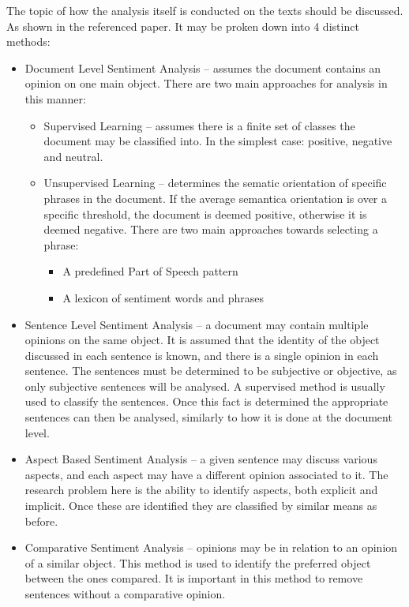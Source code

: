 The topic of how the analysis itself is conducted on the texts should be discussed. As shown in the referenced paper\cite{feldman2013techniques}. It may be proken down into 4 distinct methods:
\begin{itemize}
    \item Document Level Sentiment Analysis -- assumes the document contains an opinion on one main object. There are two main approaches for analysis in this manner:
    \begin{itemize}
        \item Supervised Learning -- assumes there is a finite set of classes the document may be classified into. In the simplest case: positive, negative and neutral.
        \item Unsupervised Learning -- determines the sematic orientation of specific phrases in the document. If the average semantica orientation is over a specific threshold, the document is deemed positive, otherwise it is deemed negative. There are two main approaches towards selecting a phrase:
        \begin{itemize}
            \item A predefined Part of Speech pattern\cite{wilson-etal-2005-recognizing}
            \item A lexicon of sentiment words and phrases\cite{10.1162/COLI_a_00049}
        \end{itemize}
    \end{itemize}
    \item Sentence Level Sentiment Analysis -- a document may contain multiple opinions on the same object. It is assumed that the identity of the object discussed in each sentence is known, and there is a single opinion in each sentence. The sentences must be determined to be subjective or objective, as only subjective sentences will be analysed. A supervised method is usually used to classify the sentences\cite{10.3115/1119355.1119372}. Once this fact is determined the appropriate sentences can then be analysed, similarly to how it is done at the document level\cite{analysePredictiveOpinionsWeb,10.3115/1119355.1119372}.
    \item Aspect Based Sentiment Analysis -- a given sentence may discuss various aspects, and each aspect may have a different opinion associated to it. The research problem here is the ability to identify aspects, both explicit and implicit. Once these are identified they are classified by similar means as before.
    \item Comparative Sentiment Analysis -- opinions may be in relation to an opinion of a similar object. This method is used to identify the preferred object between the ones compared. It is important in this method to remove sentences without a comparative opinion\cite{analysePredictiveOpinionsWeb}.
\end{itemize}


